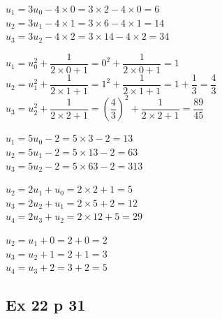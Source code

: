 \documentclass[a4paper,french]{book}
\begin{document}
\begin{enumMet}
    \item $u_{1}=3 u_{0}-4 \times 0=3 \times 2-4 \times 0=6$\\
    $u_{2}=3 u_{1}-4 \times 1=3 \times 6-4 \times 1=14$\\
    $u_{3}=3 u_{2}-4 \times 2=3 \times 14-4 \times 2=34$
    \item $u_{1}=u_{0}^{2}+\dfrac{1}{2 \times 0+1}=0^{2}+\dfrac{1}{2 \times 0+1}=1$\\
    $u_{2}=u_{1}^{2}+\dfrac{1}{2 \times 1+1}=1^{2}+\dfrac{1}{2 \times 1+1}=1+\dfrac{1}{3}=\dfrac{4}{3}$\\
    $u_{3}=u_{2}^{2}+\dfrac{1}{2 \times 2+1}=\left(\dfrac{4}{3}\right)^{2}+\dfrac{1}{2 \times 2+1}=\dfrac{89}{45}$
    \item $u_{1}=5 u_{0}-2=5 \times 3-2=13$\\
    $u_{2}=5 u_{1}-2=5 \times 13-2=63$\\
    $u_{3}=5 u_{2}-2=5 \times 63-2=313$
    \item $u_{2}=2 u_{1}+u_{0}=2 \times 2+1=5$\\
    $u_{3}=2 u_{2}+u_{1}=2 \times 5+2=12$\\
    $u_{4}=2 u_{3}+u_{2}=2 \times 12+5=29$
    \item $u_{2}=u_{1}+0=2+0=2$\\
    $u_{3}=u_{2}+1=2+1=3$\\
    $u_{4}=u_{3}+2=3+2=5$
\end{enumMet}

\subsection*{Ex 22 p 31}
\end{document}
